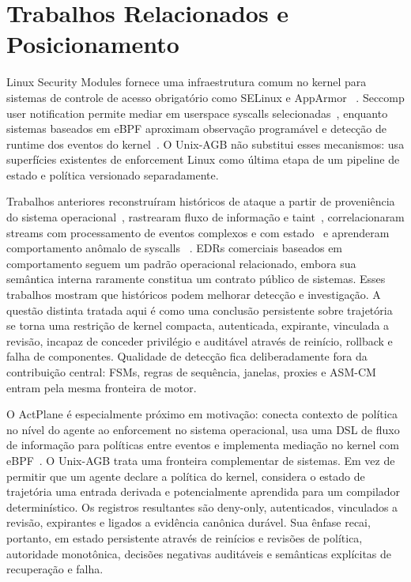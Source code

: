 \documentclass[11pt,a4paper]{article}
\begin{document}
\section{Trabalhos Relacionados e Posicionamento}

Linux Security Modules fornece uma infraestrutura comum no kernel para sistemas
de controle de acesso obrigatório como SELinux e AppArmor
~\cite{lsm,selinux,apparmor}. Seccomp user notification permite mediar em
userspace syscalls selecionadas~\cite{seccomp}, enquanto sistemas baseados em
eBPF aproximam observação programável e detecção de runtime dos eventos do
kernel~\cite{falco}. O Unix-AGB não substitui esses mecanismos: usa superfícies
existentes de enforcement Linux como última etapa de um pipeline de estado e
política versionado separadamente.

Trabalhos anteriores reconstruíram históricos de ataque a partir de proveniência
do sistema operacional~\cite{backtracker,camflow}, rastrearam fluxo de informação
e taint~\cite{denning}, correlacionaram streams com processamento de eventos
complexos e com estado~\cite{cep} e aprenderam comportamento anômalo de syscalls
~\cite{forrest}. EDRs comerciais baseados em comportamento seguem um padrão
operacional relacionado, embora sua semântica interna raramente constitua um
contrato público de sistemas. Esses trabalhos mostram que históricos podem
melhorar detecção e investigação. A questão distinta tratada aqui é como uma
conclusão persistente sobre trajetória se torna uma restrição de kernel compacta,
autenticada, expirante, vinculada a revisão, incapaz de conceder privilégio e
auditável através de reinício, rollback e falha de componentes. Qualidade de
detecção fica deliberadamente fora da contribuição central: FSMs, regras de
sequência, janelas, proxies e ASM-CM entram pela mesma fronteira de motor.

O ActPlane é especialmente próximo em motivação: conecta contexto de política
no nível do agente ao enforcement no sistema operacional, usa uma DSL de fluxo
de informação para políticas entre eventos e implementa mediação no kernel com
eBPF~\cite{actplane}. O Unix-AGB trata uma fronteira complementar de sistemas.
Em vez de permitir que um agente declare a política do kernel, considera o
estado de trajetória uma entrada derivada e potencialmente aprendida para um
compilador determinístico. Os registros resultantes são deny-only, autenticados,
vinculados a revisão, expirantes e ligados a evidência canônica durável. Sua
ênfase recai, portanto, em estado persistente através de reinícios e revisões de
política, autoridade monotônica, decisões negativas auditáveis e semânticas
explícitas de recuperação e falha.
\end{document}
